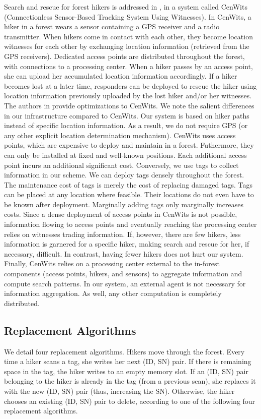 Search and rescue for forest hikers is addressed in \cite{2005 Huang}, in a system called CenWits (Connectionless Sensor-Based Tracking System Using Witnesses).  In CenWits, a hiker in a forest wears a sensor containing a GPS receiver and a radio transmitter.  When hikers come in contact with each other, they become location witnesses for each other by exchanging location information (retrieved from the GPS receivers).  Dedicated access points are distributed throughout the forest, with connections to a processing center.  When a hiker passes by an access point, she can upload her accumulated location information accordingly.  If a hiker becomes lost at a later time, responders can be deployed to rescue the hiker using location information previously uploaded by the lost hiker and/or her witnesses.  The authors in \cite{2007 Zhuang} provide optimizations to CenWits. We note the salient differences in our infrastructure compared to CenWits.  Our system is based on hiker paths instead of specific location information.  As a result, we do not require GPS (or any other explicit location determination mechanism).  CenWits uses access points, which are expensive to deploy and maintain in a forest.  Futhermore, they can only be installed at fixed and well-known positions.  Each additional access point incurs an additional significant cost.  Conversely, we use tags to collect information in our scheme.  We can deploy tags densely throughout the forest.  The maintenance cost of tags is merely the cost of replacing damaged tags.  Tags can be placed at any location where feasible.  Their locations do not even have to be known after deployment.  Marginally adding tags only marginally increases costs.  Since a dense deployment of access points in CenWits is not possible, information flowing to access points and eventually reaching the processing center relies on witnesses trading information.  If, however, there are few hikers, less information is garnered for a specific hiker, making search and rescue for her, if necessary, difficult.  In contrast, having fewer hikers does not hurt our system.  Finally, CenWits relies on a processing center external to the in-forest components (access points, hikers, and sensors) to aggregate information and compute search patterns.  In our system, an external agent is not necessary for information aggregation.  As well, any other computation is completely distributed.

\subsection{Replacement Algorithms}
\label{Section: Tracking Protocols: Forest Search and Rescue: Replacement Algorithms}
We detail four replacement algorithms. Hikers move through the forest. Every time a hiker scans a tag, she writes her next (ID, SN) pair.  If there is remaining space in the tag, the hiker writes to an empty memory slot. If an (ID, SN) pair belonging to the hiker is already in the tag (from a previous scan), she replaces it with the new (ID, SN) pair (thus, increasing the SN).  Otherwise, the hiker chooses an existing (ID, SN) pair to delete, according to one of the following four replacement algorithms.

